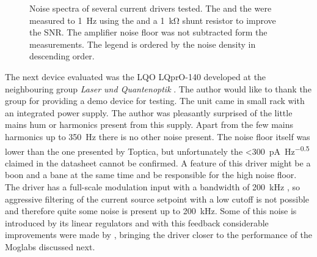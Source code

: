 \begin{figure}[hp]
    \centering
    \caption{Noise spectra of several current drivers tested. The  and the  were measured to \qty{1}{\Hz} using the  and a \qty{1}{\kilo\ohm} shunt resistor to improve the SNR. The amplifier noise floor was not subtracted form the measurements. The legend is ordered by the noise density in descending order.}
    \label{fig:laser_driver_noise_measurement}
\end{figure}

The next device evaluated was the LQO LQprO-140 developed at the neighbouring group \textit{Laser und Quantenoptik} \cite{ThorstenFuehrer}. The author would like to thank the group for providing a demo device for testing. The unit came in small rack with an integrated power supply. The author was pleasantly surprised of the little mains hum or harmonics present from this supply. Apart from the few mains harmonics up to \qty{350}{\Hz} there is no other noise present. The noise floor itself was lower than the one presented by Toptica, but unfortunately the \qty{<300}{\pA \per \Hz\tothe{0.5}} claimed in the datasheet \cite{datasheet_LQprO} cannot be confirmed. A feature of this driver might be a boon and a bane at the same time and be responsible for the high noise floor. The driver has a full-scale modulation input with a bandwidth of \qty{200}{\kHz} \cite{datasheet_LQprO}, so aggressive filtering of the current source setpoint with a low cutoff is not possible and therefore quite some noise is present up to \qty{200}{\kHz}. Some of this noise is introduced by its linear regulators and with this feedback considerable improvements were made by \citeauthor{thesis_holger} \cite{thesis_holger}, bringing the driver closer to the performance of the Moglabs  discussed next.

